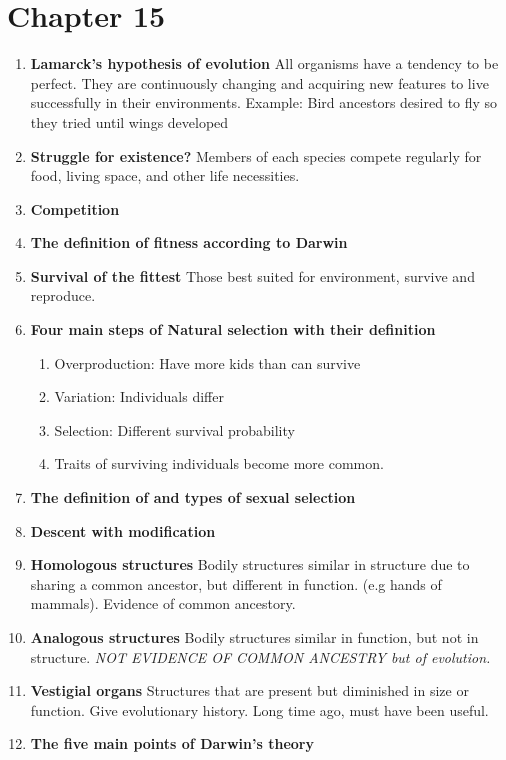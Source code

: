 \documentclass[9pt]{article}
\begin{document}
\section*{Chapter 15}
\begin{enumerate}
  \item {\bf Lamarck's hypothesis of evolution} All organisms have a
    tendency to be perfect. They are continuously changing and
    acquiring new features to live successfully in their
    environments. Example: Bird ancestors desired to fly so they tried
    until wings developed
  \item {\bf Struggle for existence?} Members of each species compete
    regularly for food, living space, and other life necessities.
  \item {\bf Competition} 
  \item {\bf The definition of fitness according to Darwin}
  \item {\bf Survival of the fittest} Those best suited for
    environment, survive and reproduce.
  \item {\bf Four main steps of Natural selection with their definition}
    \begin{enumerate}
    \item Overproduction: Have more kids than can survive
    \item Variation: Individuals differ
    \item Selection: Different survival probability
    \item Traits of surviving individuals become more common.
    \end{enumerate}
  \item {\bf The definition of and types of sexual selection}
  \item {\bf Descent with modification}
  \item {\bf Homologous structures} Bodily structures similar
    in structure due to sharing a common ancestor, but different in
    function. (e.g hands of mammals). Evidence of common ancestory.
  \item {\bf Analogous structures} Bodily structures similar in
    function, but not in structure.  {\em NOT EVIDENCE OF COMMON ANCESTRY
    but of evolution.}
  \item {\bf Vestigial organs} Structures that are present but
    diminished in size or function. Give evolutionary history. Long
    time ago, must have been useful.
  \item {\bf The five main points of Darwin's theory}
    \begin{enumerate}

\end{enumerate}
\end{enumerate}
\end{document}
